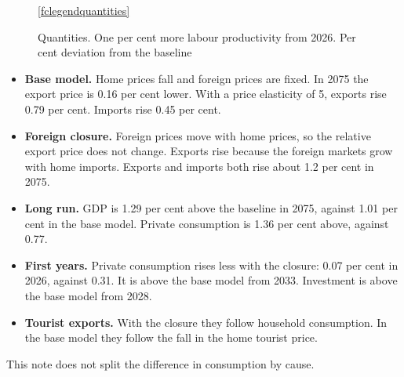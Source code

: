 \documentclass[11pt,a4paper]{article}
\begin{document}
\begin{figure}[!ht]
\centering
{}

\ref{fclegendquantities}
\caption{Quantities. One per cent more labour productivity from 2026. Per cent deviation from the baseline}
\label{fig:quantities}
\end{figure}

\begin{itemize}
\item \textbf{Base model.} Home prices fall and foreign prices are fixed. In 2075 the export price is 0.16 per cent lower. With a price elasticity of 5, exports rise 0.79 per cent. Imports rise 0.45 per cent.
\item \textbf{Foreign closure.} Foreign prices move with home prices, so the relative export price does not change. Exports rise because the foreign markets grow with home imports. Exports and imports both rise about 1.2 per cent in 2075.
\item \textbf{Long run.} GDP is 1.29 per cent above the baseline in 2075, against 1.01 per cent in the base model. Private consumption is 1.36 per cent above, against 0.77.
\item \textbf{First years.} Private consumption rises less with the closure: 0.07 per cent in 2026, against 0.31. It is above the base model from 2033. Investment is above the base model from 2028.
\item \textbf{Tourist exports.} With the closure they follow household consumption. In the base model they follow the fall in the home tourist price.
\end{itemize}
This note does not split the difference in consumption by cause.
\end{document}

